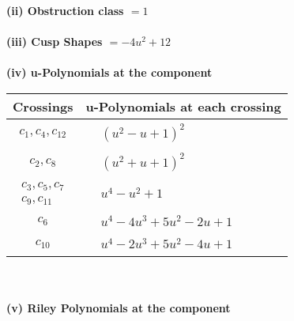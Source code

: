 \documentclass[1p]{elsarticle_modified}
\theoremstyle{definition}
\begin{document}
\flushleft \textbf{(ii) Obstruction class $= 1$}\\~\\
\flushleft \textbf{(iii) Cusp Shapes $= -4 u^2+12$}\\~\\
\newpage\renewcommand{\arraystretch}{1}
\flushleft \textbf{(iv) u-Polynomials at the component}\newline \\
\begin{tabular}{m{50pt}|m{274pt}}
Crossings & \hspace{64pt}u-Polynomials at each crossing \\
\hline $$\begin{aligned}c_{1},c_{4},c_{12}\end{aligned}$$&$\begin{aligned}
&(u^2- u+1)^2
\end{aligned}$\\
\hline $$\begin{aligned}c_{2},c_{8}\end{aligned}$$&$\begin{aligned}
&(u^2+u+1)^2
\end{aligned}$\\
\hline $$\begin{aligned}c_{3},c_{5},c_{7}\\c_{9},c_{11}\end{aligned}$$&$\begin{aligned}
&u^4- u^2+1
\end{aligned}$\\
\hline $$\begin{aligned}c_{6}\end{aligned}$$&$\begin{aligned}
&u^4-4 u^3+5 u^2-2 u+1
\end{aligned}$\\
\hline $$\begin{aligned}c_{10}\end{aligned}$$&$\begin{aligned}
&u^4-2 u^3+5 u^2-4 u+1
\end{aligned}$\\
\hline
\end{tabular}\\~\\
\newpage\renewcommand{\arraystretch}{1}
\flushleft \textbf{(v) Riley Polynomials at the component}\newline \\
\end{document}
